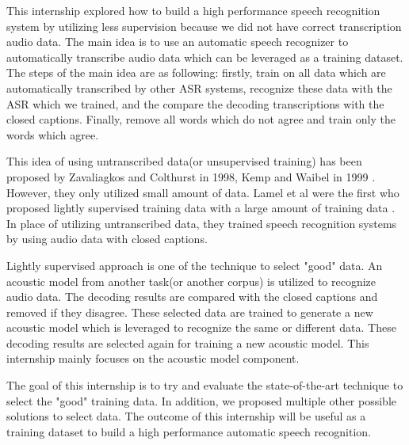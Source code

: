 This internship explored how to build a high performance speech recognition system by utilizing less supervision because we did not have correct transcription audio data. The main idea is to use an automatic speech recognizer to automatically transcribe audio data which can be leveraged as a training dataset.  The steps of the main idea are as following: firstly, train on all data which are automatically transcribed by other ASR systems, recognize these data with the ASR which we trained, and the compare the decoding transcriptions with the closed captions. Finally, remove all words which do not agree and train only the words which agree.

This idea of using untranscribed data(or unsupervised training) has been proposed by Zavaliagkos and Colthurst in 1998\cite{Zavaliagkos1998UtilizingUT}, Kemp and Waibel in 1999 \cite{Kemp_unsupervisedtraining}. However, they only utilized small amount of data. Lamel et al were the first who proposed lightly supervised training data with a large amount of training data \cite{lightlySupervised}. In place of utilizing untranscribed data, they trained  speech recognition systems by using audio data with closed captions.


Lightly supervised approach is one of the technique to select "good" data. An acoustic model from another task(or another corpus) is utilized to recognize audio data. The decoding results are compared with the closed captions and removed if they disagree. These selected data are trained to generate a new acoustic model which is leveraged to recognize the same or different data. These decoding results are selected again for training a new acoustic model. This internship mainly focuses on the acoustic model component.

 The goal of this internship is to try and evaluate the state-of-the-art technique to select the "good" training data. In addition, we proposed multiple other possible solutions to select data. The outcome of this internship will be useful as a training dataset to build a high performance automatic speech recognition.


